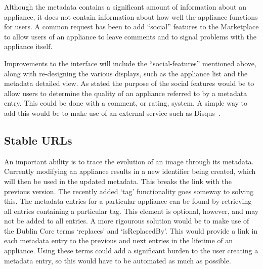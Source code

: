 Although the metadata contains a significant amount of information
about an appliance, it does not contain information about how well the
appliance functions for users.  A common request has been to add
``social'' features to the Marketplace to allow users of an appliance
to leave comments and to signal problems with the appliance itself.

Improvements to the interface will include the ``social-features''
mentioned above, along with re-designing the various displays, such as
the appliance list and the metadata detailed view. As stated the
purpose of the social features would be to allow users to determine
the quality of an appliance referred to by a metadata entry. This
could be done with a comment, or rating, system. A simple way to add
this would be to make use of an external service such as
Disqus~\cite{disqus}.

\subsection{Stable URLs}

An important ability is to trace the evolution of an image through its
metadata. Currently modifying an appliance results in a new identifier
being created, which will then be used in the updated metadata. This
breaks the link with the previous version. The recently added `tag'
functionality goes someway to solving this.  The metadata entries for
a particular appliance can be found by retrieving all entries
containing a particular tag. This element is optional, however, and
may not be added to all entries. A more rigourous solution would be to
make use of the Dublin Core terms `replaces' and `isReplacedBy'. This
would provide a link in each metadata entry to the previous and next
entries in the lifetime of an appliance. Using these terms could add a
significant burden to the user creating a metadata entry, so this
would have to be automated as much as possible.
